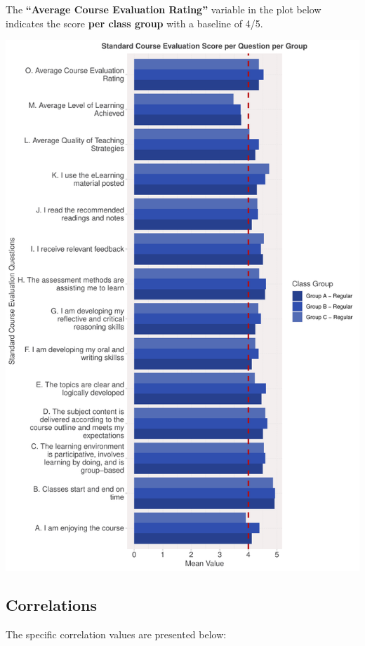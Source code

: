 \documentclass[
]{article}
\begin{document}
\newpage

The \textbf{``Average Course Evaluation Rating''} variable in the plot
below indicates the score \textbf{per class group} with a baseline of
4/5.

\includegraphics{Mid-SemesterCourseEvaluation-20240819-20241125-ADB-BBIT2.2_files/figure-latex/VisualizationsForCourseEvaluationResultsperGroup-1.pdf}

\newpage

\subsection{Correlations}\label{correlations}

The specific correlation values are presented below:
\end{document}
